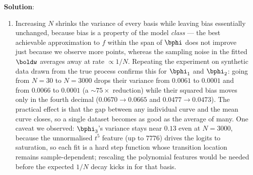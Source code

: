 \documentclass[submit]{../harvardml}
\newenvironment{solution}{
    \vspace{2mm}
    \color{blue}\noindent\textbf{Solution}:
}{}
\begin{document}
\begin{solution}
\begin{enumerate}
\noindent Bias shows up as the gap between the green true curve and the thick black
mean prediction, while variance shows up as the spread of the thin individual
curves about that black mean. For $\bphi_1$ the ten individual fits are nearly
identical gently increasing lines (variance $0.003$) but the mean is almost a
straight line that completely misses the periodic dip and peak of the truth, so bias
dominates. $\bphi_2$ bends slightly toward the true shape, lowering bias to $0.049$
at essentially no cost in variance. For $\bphi_3$ the individual curves are wildly
different saturated step functions whose transition point moves across the whole
interval (variance $0.143$, a $47\times$ increase), yet their \emph{average} tracks
the true curve far better than any individual fit, so bias falls to $0.014$ --- the
classic trade: increasing capacity buys bias reduction and pays for it in variance.
None of the three can match $f(t) = 0.4\cos(1.1t+1)+0.5$ exactly since none is
periodic; $\bphi_1$ cannot even be non-monotone, $\bphi_2$ captures a single turn,
and $\bphi_3$ has enough degrees of freedom to approximate one full cycle on $[0,6]$
in expectation but not reliably from any single $30$-point dataset.

\item
Increasing $N$ shrinks the variance of every basis while leaving bias essentially
unchanged, because bias is a property of the model \emph{class} --- the best
achievable approximation to $f$ within the span of $\bphi$ does not improve just
because we observe more points, whereas the sampling noise in the fitted $\boldw$
averages away at rate $\propto 1/N$. Repeating the experiment on synthetic data drawn
from the true process confirms this for $\bphi_1$ and $\bphi_2$: going from $N=30$ to
$N=3000$ drops their variance from $0.0061$ to $0.0001$ and from $0.0066$ to
$0.0001$ (a $\sim\!75\times$ reduction) while their squared bias moves only in the
fourth decimal ($0.0670 \to 0.0665$ and $0.0477 \to 0.0473$). The practical effect is
that the gap between any individual curve and the mean curve closes, so a single
dataset becomes as good as the average of many. One caveat we observed: $\bphi_3$'s
variance stays near $0.13$ even at $N=3000$, because the unnormalised $t^5$ feature
(up to $7776$) drives the logits to saturation, so each fit is a hard step function
whose transition location remains sample-dependent; rescaling the polynomial features
would be needed before the expected $1/N$ decay kicks in for that basis.


\end{enumerate}
\end{solution}
\end{document}
